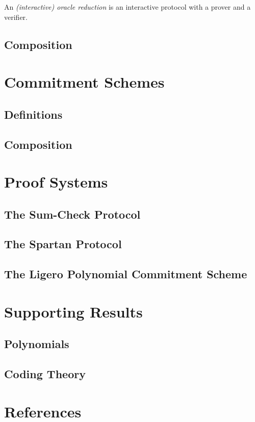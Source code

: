 \begin{definition}\label{def:oracle_reduction}
    An \emph{(interactive) oracle reduction} is an interactive protocol with a prover and a verifier.
\end{definition}

\begin{definition}[Completeness]
    \label{def:completeness}
\end{definition}

\section{Composition}

\chapter{Commitment Schemes}

\section{Definitions}

\section{Composition}



\chapter{Proof Systems}

\section{The Sum-Check Protocol}

\section{The Spartan Protocol}

\section{The Ligero Polynomial Commitment Scheme}


\chapter{Supporting Results}

\section{Polynomials}

\section{Coding Theory}


\chapter{References}

